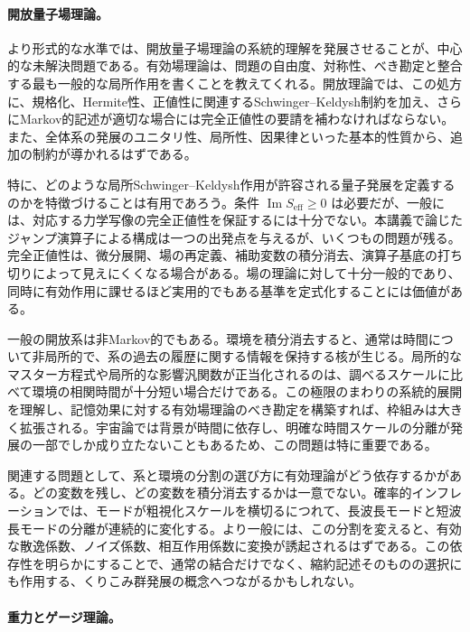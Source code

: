 \documentclass[a4paper,11pt,oneside]{article}
\theoremstyle{definition}
\numberwithin{equation}{section}
\begin{document}
\paragraph{開放量子場理論。}



より形式的な水準では、開放量子場理論の系統的理解を発展させることが、中心的な未解決問題である。有効場理論は、問題の自由度、対称性、べき勘定と整合する最も一般的な局所作用を書くことを教えてくれる。開放理論では、この処方に、規格化、Hermite性、正値性に関連するSchwinger--Keldysh制約を加え、さらにMarkov的記述が適切な場合には完全正値性の要請を補わなければならない。また、全体系の発展のユニタリ性、局所性、因果律といった基本的性質から、追加の制約が導かれるはずである。



特に、どのような局所Schwinger--Keldysh作用が許容される量子発展を定義するのかを特徴づけることは有用であろう。条件
\(
\operatorname{Im}S_{\mathrm{eff}}\geq 0
\)
は必要だが、一般には、対応する力学写像の完全正値性を保証するには十分でない。本講義で論じたジャンプ演算子による構成は一つの出発点を与えるが、いくつもの問題が残る。完全正値性は、微分展開、場の再定義、補助変数の積分消去、演算子基底の打ち切りによって見えにくくなる場合がある。場の理論に対して十分一般的であり、同時に有効作用に課せるほど実用的でもある基準を定式化することには価値がある。



一般の開放系は非Markov的でもある。環境を積分消去すると、通常は時間について非局所的で、系の過去の履歴に関する情報を保持する核が生じる。局所的なマスター方程式や局所的な影響汎関数が正当化されるのは、調べるスケールに比べて環境の相関時間が十分短い場合だけである。この極限のまわりの系統的展開を理解し、記憶効果に対する有効場理論のべき勘定を構築すれば、枠組みは大きく拡張される。宇宙論では背景が時間に依存し、明確な時間スケールの分離が発展の一部でしか成り立たないこともあるため、この問題は特に重要である。



関連する問題として、系と環境の分割の選び方に有効理論がどう依存するかがある。どの変数を残し、どの変数を積分消去するかは一意でない。確率的インフレーションでは、モードが粗視化スケールを横切るにつれて、長波長モードと短波長モードの分離が連続的に変化する。より一般には、この分割を変えると、有効な散逸係数、ノイズ係数、相互作用係数に変換が誘起されるはずである。この依存性を明らかにすることで、通常の結合だけでなく、縮約記述そのものの選択にも作用する、くりこみ群発展の概念へつながるかもしれない。



\paragraph{重力とゲージ理論。}
\end{document}
